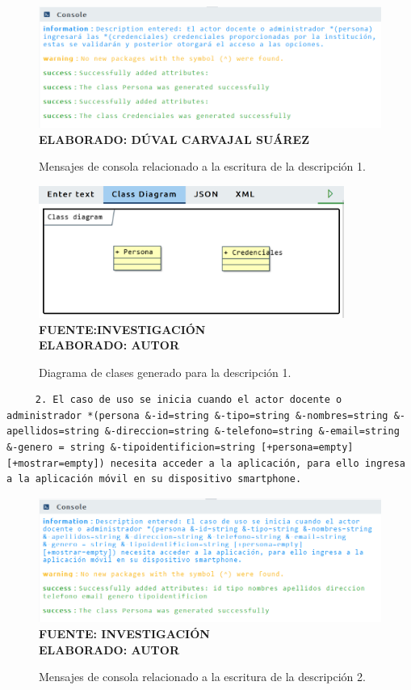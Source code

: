 \begin{figure}[h!]
	\centering
	\caption{Mensajes de consola relacionado a la escritura de la descripción 1.}
	\includegraphics[width=12cm]{img/not-eva-001.png}
	\label{fig:not_eva_001}
	\textbf{\\ ELABORADO: DÚVAL CARVAJAL SUÁREZ}
\end{figure}

\begin{figure}[H]
	\centering
	\caption{Diagrama de clases generado para la descripción 1.}
	\includegraphics[width=10cm]{img/dc-eva-001.png}
	\label{fig:dc_eva_001}
	\vspace{4mm}
	{\footnotesize \textbf{\\ FUENTE:INVESTIGACIÓN} \textbf{\\ ELABORADO: AUTOR}}
\end{figure}

\begin{lstlisting}
	 2. El caso de uso se inicia cuando el actor docente o administrador *(persona &-id=string &-tipo=string &-nombres=string &-apellidos=string &-direccion=string &-telefono=string &-email=string &-genero = string &-tipoidentificion=string [+persona=empty] [+mostrar=empty]) necesita acceder a la aplicación, para ello ingresa a la aplicación móvil en su dispositivo smartphone. \end{lstlisting}
 
 \begin{figure}[h!]
 	\centering
 	\caption{Mensajes de consola relacionado a la escritura de la descripción 2.}
 	\includegraphics[width=14cm]{img/not-eva-002.png}
 	\label{fig:not_eva_002}
 	\vspace{4mm}
 	{\footnotesize \textbf{\\ FUENTE: INVESTIGACIÓN} \textbf{\\ ELABORADO: AUTOR}}
 \end{figure}
 
